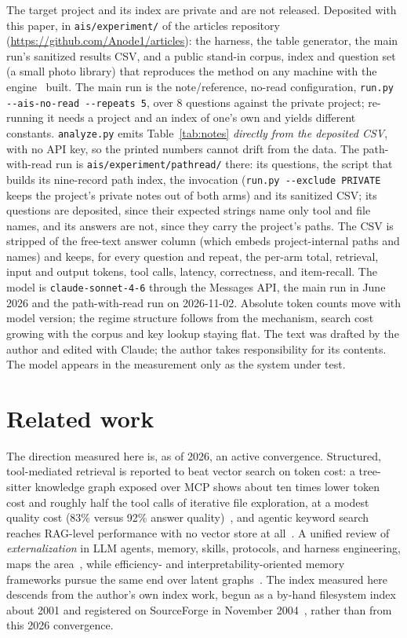\documentclass[11pt]{article}
\newcommand{\code}[1]{\texttt{#1}}
\begin{document}
The target project and its index are private and are not released. Deposited
with this paper, in \code{ais/experiment/} of the articles repository
(\url{https://github.com/Anode1/articles}): the harness, the table generator, the
main run's sanitized results CSV, and a public stand-in corpus, index and question
set (a small photo library) that reproduces the method on any machine with the
engine~\cite{ais} built. The main run is
the note/reference, no-read configuration, \code{run.py -{}-ais-no-read -{}-repeats
5}, over 8 questions against the private project; re-running it needs a project
and an index of one's own and yields different constants. \code{analyze.py} emits
Table~\ref{tab:notes} \emph{directly from the deposited CSV}, with no API key, so
the printed numbers cannot drift from the data. The path-with-read run is
\code{ais/experiment/pathread/} there: its questions, the script
that builds its nine-record path index, the invocation (\code{run.py -{}-exclude
PRIVATE} keeps the project's private notes out of both arms) and its sanitized
CSV; its questions are deposited, since their expected strings name only tool
and file names, and its answers are not, since they carry the project's paths. The CSV is stripped of
the free-text answer column (which embeds project-internal paths and names) and
keeps, for every question and repeat, the per-arm total, retrieval, input and
output tokens, tool calls, latency, correctness, and item-recall. The model is
\code{claude-sonnet-4-6} through the Messages API, the main run in June 2026 and the path-with-read run on 2026-11-02. Absolute token counts move with model version; the
regime structure follows from the mechanism, search cost growing with the corpus
and key lookup staying flat. The text was drafted by the author and edited with Claude; the author takes
responsibility for its contents. The model appears in the measurement only as the
system under test.

\section{Related work}

The direction measured here is, as of 2026, an active convergence. Structured,
tool-mediated retrieval is reported to beat vector search on token cost: a
tree-sitter knowledge graph exposed over MCP shows about ten times lower token cost
and roughly half the tool calls of iterative file exploration, at a modest quality
cost (83\% versus 92\% answer quality)~\cite{vogel2026}, and agentic keyword search reaches
RAG-level performance with no vector store at all~\cite{subramanian2026}. A unified review of
\emph{externalization} in LLM agents, memory, skills, protocols, and harness
engineering, maps the area~\cite{zhou2026}, while efficiency- and interpretability-oriented
memory frameworks pursue the same end over latent graphs~\cite{zhang2026}. The index measured here descends from the author's own index work,
begun as a by-hand filesystem index about 2001 and registered on SourceForge in
November 2004~\cite{priority}, rather than from this 2026 convergence.
\end{document}
